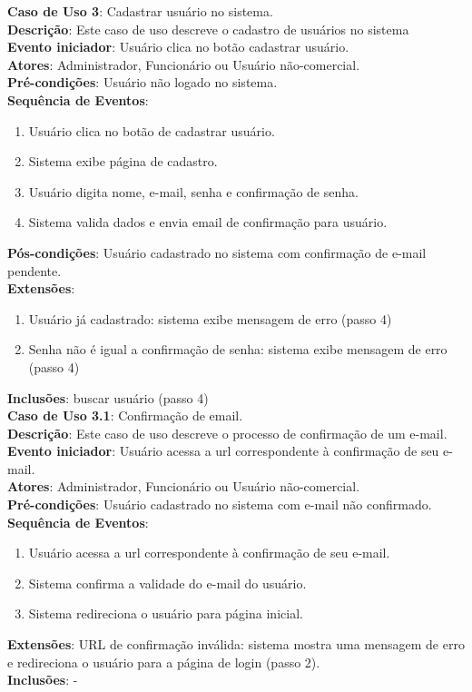 \documentclass[]{politex}
\begin{document}
\noindent \textbf{Caso de Uso 3}: Cadastrar usuário no sistema.  \\
\textbf{Descrição}: Este caso de uso descreve o cadastro de usuários no sistema \\
\textbf{Evento iniciador}: Usuário clica no botão cadastrar usuário. \\
\textbf{Atores}: Administrador, Funcionário ou Usuário não-comercial. \\
\textbf{Pré-condições}: Usuário não logado no sistema. \\
\textbf{Sequência de Eventos}: 
\begin{enumerate}
\item Usuário clica no botão de cadastrar usuário.
\item Sistema exibe página de cadastro.
\item Usuário digita nome, e-mail, senha e confirmação de senha.
\item Sistema valida dados e envia email de confirmação para usuário.
\end{enumerate}
\textbf{Pós-condições}: Usuário cadastrado no sistema com confirmação de e-mail pendente. \\
\textbf{Extensões}:
\begin{enumerate}
\item Usuário já cadastrado: sistema exibe mensagem de erro (passo 4)
\item Senha não é igual a confirmação de senha: sistema exibe mensagem de erro (passo 4)
\end{enumerate}
\textbf{Inclusões}: buscar usuário (passo 4) \\

\noindent \textbf{Caso de Uso 3.1}: Confirmação de email. \\
\textbf{Descrição}: Este caso de uso descreve o processo de confirmação de um e-mail. \\
\textbf{Evento iniciador}: Usuário acessa a url correspondente à confirmação de seu e-mail. \\
\textbf{Atores}: Administrador, Funcionário ou Usuário não-comercial. \\
\textbf{Pré-condições}: Usuário cadastrado no sistema com e-mail não confirmado. \\
\textbf{Sequência de Eventos}:
\begin{enumerate}
\item Usuário acessa a url correspondente à confirmação de seu e-mail.
\item Sistema confirma a validade do e-mail do usuário.
\item Sistema redireciona o usuário para página inicial.
\end{enumerate}
\textbf{Extensões}: URL de confirmação inválida: sistema mostra uma mensagem de
erro e redireciona o usuário para a página de login (passo 2). \\
\textbf{Inclusões}: - \\
\end{document}
